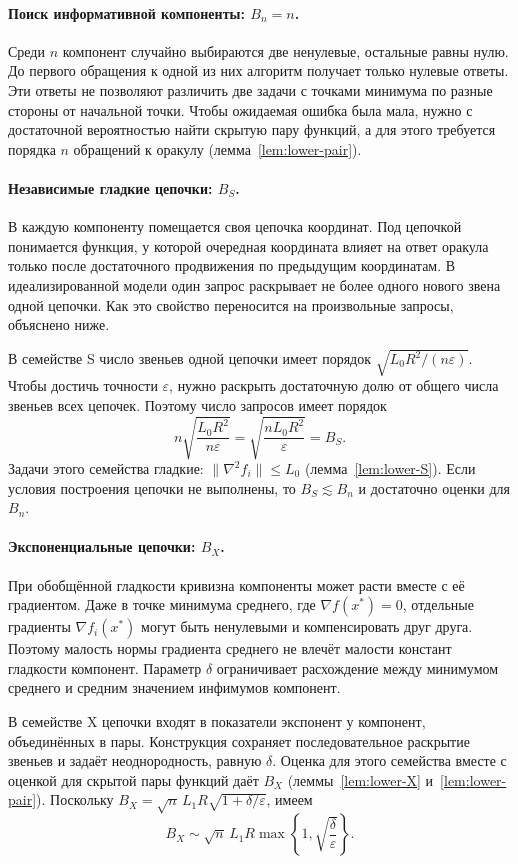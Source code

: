 \paragraph{Поиск информативной компоненты: $B_n=n$.}
Среди $n$ компонент случайно выбираются две ненулевые, остальные
равны нулю. До первого
обращения к одной из них алгоритм получает только нулевые ответы.
Эти ответы не позволяют различить две задачи с точками минимума по разные
стороны от начальной точки. Чтобы ожидаемая ошибка была мала,
нужно с достаточной вероятностью найти скрытую пару функций, а для этого
требуется порядка $n$ обращений к оракулу
(лемма~\ref{lem:lower-pair}).

\paragraph{Независимые гладкие цепочки: $B_S$.}
В каждую компоненту помещается своя цепочка координат. Под цепочкой
понимается функция, у которой очередная координата влияет на ответ
оракула только после достаточного продвижения по предыдущим
координатам. В идеализированной модели один запрос раскрывает не более
одного нового звена одной цепочки. Как это свойство переносится на
произвольные запросы, объяснено ниже.

В семействе S число звеньев одной цепочки имеет порядок
$\sqrt{L_0R^2/(n\varepsilon)}$. Чтобы достичь точности $\varepsilon$, нужно
раскрыть достаточную долю от общего числа звеньев всех цепочек. Поэтому
число запросов имеет порядок
\[
 n\sqrt{\frac{L_0R^2}{n\varepsilon}}
 =\sqrt{\frac{nL_0R^2}{\varepsilon}}=B_S.
\]
Задачи этого семейства гладкие: $\|\nabla^2f_i\|\le L_0$
(лемма~\ref{lem:lower-S}). Если условия построения цепочки не выполнены, то
$B_S\lesssim B_n$ и достаточно оценки для $B_n$.

\paragraph{Экспоненциальные цепочки: $B_X$.}
При обобщённой гладкости кривизна компоненты может расти вместе
с её градиентом. Даже в точке минимума среднего, где
$\nabla f(x^\ast)=0$, отдельные градиенты $\nabla f_i(x^\ast)$
могут быть ненулевыми и компенсировать друг друга. Поэтому малость нормы градиента среднего не влечёт
малости констант гладкости компонент.
Параметр $\delta$ ограничивает расхождение между минимумом среднего
и средним значением инфимумов компонент.

В семействе X цепочки входят в показатели
экспонент у компонент, объединённых в пары. Конструкция сохраняет последовательное
раскрытие звеньев и задаёт неоднородность, равную $\delta$.
Оценка для этого семейства вместе с оценкой для скрытой пары функций даёт $B_X$
(леммы~\ref{lem:lower-X} и~\ref{lem:lower-pair}). Поскольку
$B_X=\sqrt n\,L_1R\sqrt{1+\delta/\varepsilon}$, имеем
\[
  B_X\sim\sqrt n\,L_1R\max\left\{1,\sqrt{\frac\delta\varepsilon}\right\}.
\]


